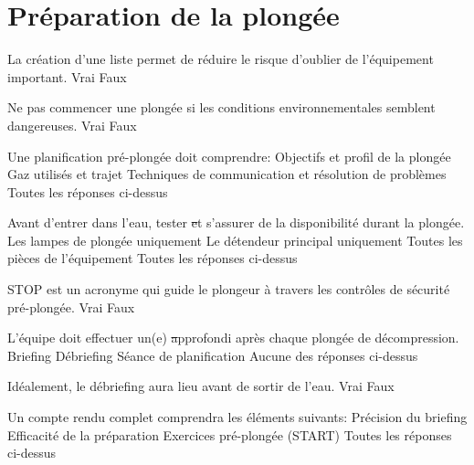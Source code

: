 \documentclass[english,10pt,a4paper,twoside]{article}
\begin{document}
	\section{Préparation de la plongée}
	\begin{outline}
		\1 La création d'une liste permet de réduire le risque d'oublier de l'équipement important.
			\2 Vrai
			\2 Faux

		\1 Ne pas commencer une plongée si les conditions environnementales semblent dangereuses.
			\2 Vrai
			\2 Faux

		\1 Une planification pré-plongée doit comprendre:
			\2 Objectifs et profil de la plongée
			\2 Gaz utilisés et trajet
			\2 Techniques de communication et résolution de problèmes
			\2 Toutes les réponses ci-dessus

		\1 Avant d'entrer dans l'eau, tester \st et s'assurer de la disponibilité durant la plongée.
			\2 Les lampes de plongée uniquement
			\2 Le détendeur principal uniquement
			\2 Toutes les pièces de l'équipement
			\2 Toutes les réponses ci-dessus

		\1 STOP est un acronyme qui guide le plongeur à travers les contrôles de sécurité pré-plongée.
			\2 Vrai
			\2 Faux

		\1 L'équipe doit effectuer un(e) \st approfondi après chaque plongée de décompression.
			\2 Briefing
			\2 Débriefing
			\2 Séance de planification
			\2 Aucune des réponses ci-dessus

		\1 Idéalement, le débriefing aura lieu avant de sortir de l'eau.
			\2 Vrai
			\2 Faux

		\1 Un compte rendu complet comprendra les éléments suivants:
			\2 Précision du briefing
			\2 Efficacité de la préparation
			\2 Exercices pré-plongée (START)
			\2 Toutes les réponses ci-dessus
	\end{outline}
	\vfill
	\pagebreak
\end{document}
